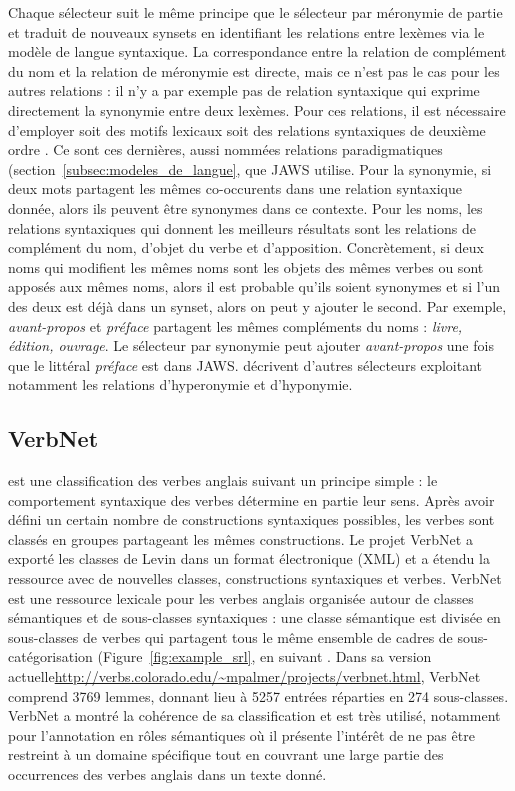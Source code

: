 Chaque sélecteur suit le même principe que le sélecteur par méronymie de partie
et traduit de nouveaux synsets en identifiant les relations entre lexèmes via
le modèle de langue syntaxique. La correspondance entre la relation de
complément du nom et la relation de méronymie est directe, mais ce n'est pas le
cas pour les autres relations : il n'y a par exemple pas de relation syntaxique
qui exprime directement la synonymie entre deux lexèmes. Pour ces relations, il
est nécessaire d'employer soit des motifs lexicaux \citep{hearst1992automatic}
soit des relations syntaxiques de deuxième ordre \citep{lenci2012identifying}.
Ce sont ces dernières, aussi nommées relations paradigmatiques
(section~\ref{subsec:modeles_de_langue}, que JAWS utilise. Pour la synonymie,
si deux mots partagent les mêmes co-occurents dans une relation syntaxique
donnée, alors ils peuvent être synonymes dans ce contexte. Pour les noms, les
relations syntaxiques qui donnent les meilleurs résultats sont les relations de
complément du nom, d'objet du verbe et d'apposition. Concrètement, si deux noms
qui modifient les mêmes noms sont les objets des mêmes verbes ou sont apposés
aux mêmes noms, alors il est probable qu'ils soient synonymes et si l'un des
deux est déjà dans un synset, alors on peut y ajouter le second. Par exemple,
\textit{avant-propos} et \textit{préface} partagent les mêmes compléments du
noms : \textit{livre, édition, ouvrage}. Le sélecteur par synonymie peut
ajouter \textit{avant-propos} une fois que le littéral \textit{préface} est
dans JAWS. \citep{mouton2010jaws,mouton2010phd} décrivent d'autres sélecteurs
exploitant notamment les relations d'hyperonymie et d'hyponymie.

\subsection{VerbNet}
\label{subsec:presentation_verbnet}

\cite{levin1993english} est une classification des verbes anglais suivant un
principe simple : le comportement syntaxique des verbes détermine en partie
leur sens. Après avoir défini un certain nombre de constructions syntaxiques
possibles, les verbes sont classés en groupes partageant les mêmes
constructions. Le projet VerbNet a exporté les classes de Levin dans un format
électronique (XML) et a étendu la ressource avec de nouvelles classes,
constructions syntaxiques et verbes. VerbNet est une ressource lexicale pour
les verbes anglais organisée autour de classes sémantiques et de sous-classes
syntaxiques : une classe sémantique est divisée en sous-classes de verbes qui
partagent tous le même ensemble de cadres de sous-catégorisation
(Figure~\ref{fig:example_srl}, en suivant \cite{levin1993english}.  Dans sa
version actuelle\url{http://verbs.colorado.edu/~mpalmer/projects/verbnet.html},
VerbNet comprend 3769 lemmes, donnant lieu à 5257 entrées réparties en 274
sous-classes. VerbNet a montré la cohérence de sa classification et est très
utilisé, notamment pour l'annotation en rôles sémantiques
\citep{swier2005exploiting,palmer2013semantic} où il présente l'intérêt de ne
pas être restreint à un domaine spécifique tout en couvrant une large partie
des occurrences des verbes anglais dans un texte donné.


